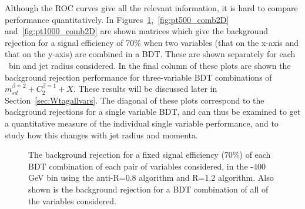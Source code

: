 Although the ROC curves give all the relevant information, it is hard
to compare performance quantitatively. In
Figures~\ref{fig:pt300_comb2D},~\ref{fig:pt500_comb2D}
and~\ref{fig:pt1000_comb2D} are shown matrices which give the
background rejection for a signal efficiency of 70\% when two
variables (that on the x-axis and that on the y-axis) are combined in
a BDT. These are shown separately for each \pt~bin and jet radius
considered. In the
final column of these plots are shown the background rejection
performance for three-variable BDT combinations of $m_{sd}^{\beta=2} +
C_2^{\beta=1} + X$. These results will be discussed later in Section~\ref{sec:Wtagallvars}. The diagonal of these plots correspond to the background
rejections for a single variable BDT, and can thus be examined to get a
quantitative measure of the individual single variable performance,
and to study how this changes with jet radius and momenta. 

\begin{figure}
\centering
{}
\caption{
The background rejection
for a fixed signal efficiency (70\%) of each BDT combination of
each pair of variables considered, in the -400 GeV bin using the anti-\kT R=0.8
algorithm and R=1.2 algorithm. Also shown is the background rejection
for a BDT combination of all of the variables considered.
}
\label{fig:pt300_comb2D}
\end{figure}


